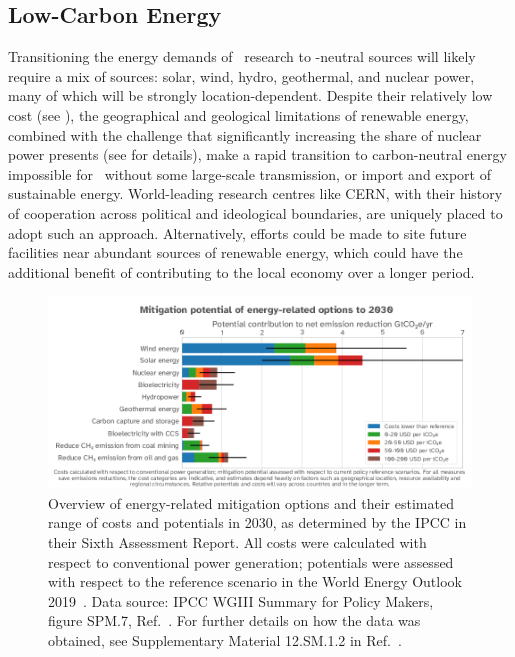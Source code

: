 \documentclass[../SustainableHEP.tex]{subfiles}
\begin{document}

\newpage

\subsection{Low-Carbon Energy}
\label{sec:Ene-Transition}

Transitioning the energy demands of \ACR\ research to \CdO-neutral sources will likely require a mix of sources: solar, wind, hydro, geothermal, and nuclear power, many of which will be strongly location-dependent. Despite their relatively low cost (see ), the
geographical and geological limitations of renewable energy, combined with the challenge that significantly increasing the share of nuclear power presents (see  for details), make a rapid transition to carbon-neutral energy impossible for \ACR\ without some large-scale transmission, or import and export of sustainable energy.  World-leading research centres like CERN,  with their history of cooperation across political and ideological boundaries, are uniquely placed to adopt such an approach.  Alternatively, efforts could be made to site future facilities near abundant sources of renewable energy, which could have the additional benefit of contributing to the local economy over a longer period.


\begin{figure}[!ht]
     \centering
     \includegraphics[width=0.99\linewidth]{Sections/Figs/Energy/IPCCMitigationPotential.png}
     \caption[IPCC 
    Mitigation potential for alternative sources of energy]{Overview of energy-related mitigation options and their estimated range of costs and potentials in 2030, as determined by the IPCC in their Sixth Assessment Report. All costs were calculated with respect to conventional power generation; potentials were assessed with respect to the reference scenario in the World Energy Outlook 2019~\cite{IEA2019}.  Data source: IPCC WGIII Summary for Policy Makers, figure SPM.7, Ref.~\cite{IPCCMitigationData}.  For further details on how the data was obtained, see Supplementary Material 12.SM.1.2 in Ref.~\cite{IPCCMitigationReport}.}
     \label{fig:ene-mitigation}
 \end{figure}
\end{document}
